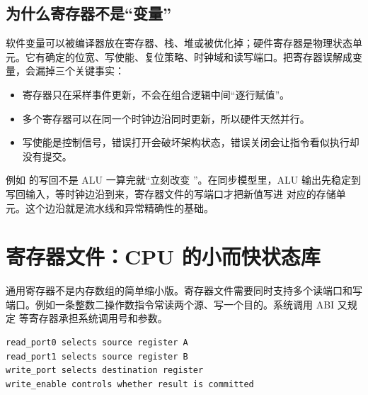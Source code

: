 \subsection{为什么寄存器不是“变量”}

软件变量可以被编译器放在寄存器、栈、堆或被优化掉；硬件寄存器是物理状态单元。它有确定的位宽、写使能、复位策略、时钟域和读写端口。把寄存器误解成变量，会漏掉三个关键事实：

\begin{itemize}
\tightlist
\item 寄存器只在采样事件更新，不会在组合逻辑中间“逐行赋值”。
\item 多个寄存器可以在同一个时钟边沿同时更新，所以硬件天然并行。
\item 写使能是控制信号，错误打开会破坏架构状态，错误关闭会让指令看似执行却没有提交。
\end{itemize}

例如  的写回不是 ALU 一算完就“立刻改变 ”。在同步模型里，ALU 输出先稳定到写回输入，等时钟边沿到来，寄存器文件的写端口才把新值写进  对应的存储单元。这个边沿就是流水线和异常精确性的基础。

\section{寄存器文件：CPU 的小而快状态库}

通用寄存器不是内存数组的简单缩小版。寄存器文件需要同时支持多个读端口和写端口。例如一条整数二操作数指令常读两个源、写一个目的。系统调用 ABI 又规定  等寄存器承担系统调用号和参数。

\begin{lstlisting}
read_port0 selects source register A
read_port1 selects source register B
write_port selects destination register
write_enable controls whether result is committed
\end{lstlisting}

